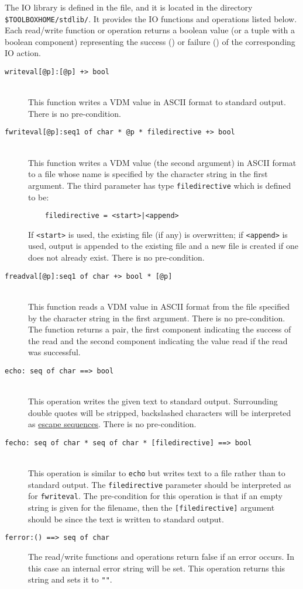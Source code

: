 \documentclass[\pformat,12pt]{article}
\begin{document}
The IO library is defined in the 
 file, and it
is located
in the directory \verb+$TOOLBOXHOME/stdlib/+.  
It provides the IO functions and
operations listed below. Each read/write function or operation returns
a boolean 
value (or a tuple with a boolean component) representing the success
() or failure () of the corresponding IO
action. 

\begin{description}
\item[\texttt{writeval[@p]:[@p] +> bool}] \mbox{}\\
  This function writes a VDM value in ASCII format to standard
  output. There is no pre-condition.
\item[\texttt{fwriteval[@p]:seq1 of char * @p * filedirective +>
    bool}] \mbox{}\\
  This function writes a VDM value (the second argument) in ASCII
  format to a file whose  
  name is specified by the character string in the first argument. The
  third parameter has type \texttt{filedirective} which is defined to be:
  \begin{verbatim}
    filedirective = <start>|<append> 
  \end{verbatim}
  If \texttt{<start>} is used, the existing file (if any) is
  overwritten; if \texttt{<append>} is used, output is appended to the
  existing file and a new file is created if one does not already
  exist. There is no pre-condition.
\item[\texttt{freadval[@p]:seq1 of char +> bool * [@p]}] \mbox{}\\
  This function reads a VDM value in ASCII format from the file
  specified by the character string in the first argument. There is no
  pre-condition. The function returns a pair, the first component
  indicating the success of the read and the second component
  indicating the value read if the read was successful.
\item[\texttt{echo: seq of char ==> bool}] \mbox{}\\
  This operation writes the given text to standard output. Surrounding
  double quotes will be stripped, backslashed characters will be
  interpreted as \hyperlink{rule:escape sequence}{escape sequences}. There is no
  pre-condition. 
\item[\texttt{fecho: seq of char * seq of char * [filedirective] ==> bool}]
  \mbox{}\\
  This operation is similar to \texttt{echo} but writes text to a file
  rather than to standard output. The \texttt{filedirective} parameter
  should be interpreted as for \texttt{fwriteval}. The pre-condition
  for this operation is that if an empty string
  is given for the filename, then the \texttt{[filedirective]}
  argument should be  since the text is written to standard
  output. 
\item[\texttt{ferror:()  ==> seq of char}]
  The read/write functions and operations return false if an error
  occurs. In this case an internal error string will be set. This
  operation returns this string and sets it to \texttt{""}.
\end{description}
\end{document}
